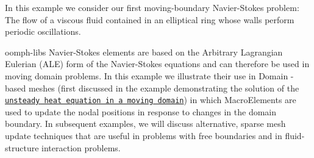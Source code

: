 In this example we consider our first moving-\/boundary Navier-\/\+Stokes problem\+: The flow of a viscous fluid contained in an elliptical ring whose walls perform periodic oscillations.

{\ttfamily oomph-\/lib\textquotesingle{}s} Navier-\/\+Stokes elements are based on the Arbitrary Lagrangian Eulerian (A\+LE) form of the Navier-\/\+Stokes equations and can therefore be used in moving domain problems. In this example we illustrate their use in {\ttfamily Domain} -\/ based meshes (first discussed in the example demonstrating the solution of the \href{../../../unsteady_heat/two_d_unsteady_heat_ALE/html/index.html}{\tt unsteady heat equation in a moving domain}) in which {\ttfamily Macro\+Elements} are used to update the nodal positions in response to changes in the domain boundary. In subsequent examples, we will discuss alternative, sparse mesh update techniques that are useful in problems with free boundaries and in fluid-\/structure interaction problems.

